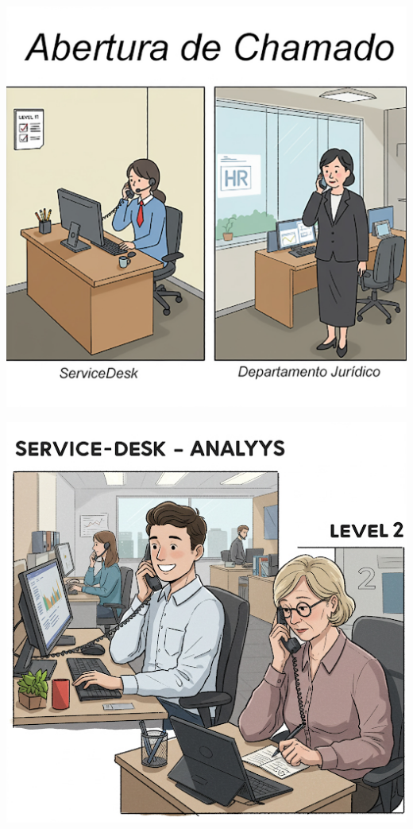 \documentclass[
]{book}
\begin{document}
\includegraphics{images/InfraEstrutura/ITIL/01-Gerencia_de_Incidentes-01.jpg}

\includegraphics{images/InfraEstrutura/ITIL/01-Gerencia_de_Incidentes-2.jpg}
\end{document}
